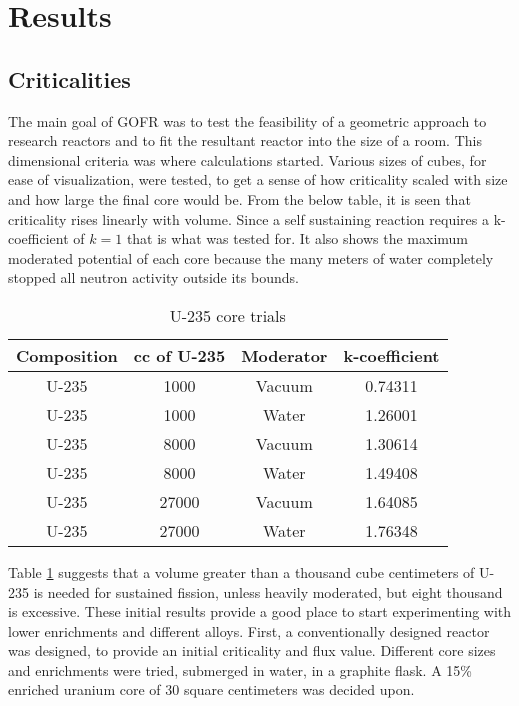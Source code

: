 \section{Results}
\label{sec:results}

\subsection{Criticalities}

The main goal of GOFR was to test the feasibility of a geometric approach to research reactors and to fit the resultant reactor into the size of a room. This dimensional criteria was where calculations started. Various sizes of cubes, for ease of visualization, were tested, to get a sense of how criticality scaled with size and how large the final core would be. From the below table, it is seen that criticality rises linearly with volume. Since a self sustaining reaction requires a k-coefficient of $k=1$ that is what was tested for. It also shows the maximum moderated potential of each core because the many meters of water completely stopped all neutron activity outside its bounds.

\begin{table}[!htbp]
\centering
\caption{U-235 core trials}
\label{tab:pureU}
\begin{tabular}{|c|c|c|c|}
\hline
Composition & cc of U-235 		& Moderator	& k-coefficient  \\
\hline
U-235  		&  1000             & Vacuum	& 0.74311     \\
\hline
U-235  		&  1000             & Water     & 1.26001     \\
\hline
U-235  		&  8000             & Vacuum    & 1.30614     \\
\hline
U-235  		&  8000             & Water     & 1.49408     \\
\hline
U-235  		& 27000             & Vacuum    & 1.64085     \\
\hline
U-235  		& 27000             & Water     & 1.76348     \\
\hline
\end{tabular}
\end{table}

Table \ref{tab:pureU} suggests that a volume greater than a thousand cube centimeters of U-235 is needed for sustained fission, unless heavily moderated, but eight thousand is excessive. These initial results provide a good place to start experimenting with lower enrichments and different alloys. First, a conventionally designed reactor was designed, to provide an initial criticality and flux value. Different core sizes and enrichments were tried, submerged in water, in a graphite flask. A 15\% enriched uranium core of 30 square centimeters was decided upon.

